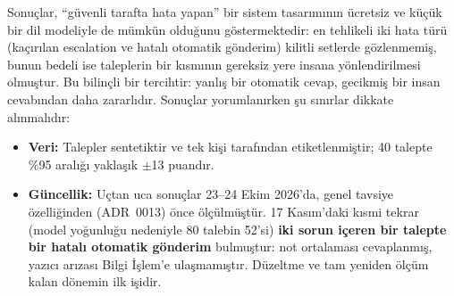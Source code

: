 Sonuçlar, ``güvenli tarafta hata yapan'' bir sistem tasarımının ücretsiz ve küçük bir dil modeliyle
de mümkün olduğunu göstermektedir: en tehlikeli iki hata türü (kaçırılan escalation ve hatalı otomatik
gönderim) kilitli setlerde gözlenmemiş, bunun bedeli ise taleplerin bir kısmının gereksiz yere insana
yönlendirilmesi olmuştur. Bu bilinçli bir tercihtir: yanlış bir otomatik cevap, gecikmiş bir insan
cevabından daha zararlıdır. Sonuçlar yorumlanırken şu sınırlar dikkate alınmalıdır:

\begin{itemize}
  \item \textbf{Veri:} Talepler sentetiktir ve tek kişi tarafından etiketlenmiştir; 40 talepte \%95
        aralığı yaklaşık $\pm$13 puandır.
  \item \textbf{Güncellik:} Uçtan uca sonuçlar 23--24 Ekim 2026'da, genel tavsiye özelliğinden
        (ADR~0013) önce ölçülmüştür. 17 Kasım'daki kısmi tekrar (model yoğunluğu nedeniyle 80 talebin
        52'si) \textbf{iki sorun içeren bir talepte bir hatalı otomatik gönderim} bulmuştur: not
        ortalaması cevaplanmış, yazıcı arızası Bilgi İşlem'e ulaşmamıştır. Düzeltme ve tam yeniden
        ölçüm kalan dönemin ilk işidir.
\end{itemize}
